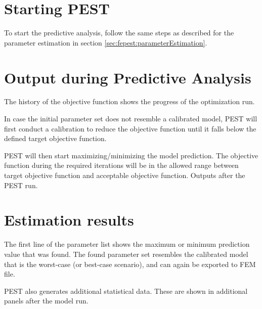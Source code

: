 \section{Starting PEST}

To start the predictive analysis, follow the same steps as described for the parameter estimation in section \ref{sec:fepest:parameterEstimation}.

\section{Output during Predictive Analysis}

The history of the objective function shows the progress of the optimization run. 

In case the initial parameter set does not resemble a calibrated model, PEST will first conduct a calibration to reduce the objective function until it falls below the defined target objective function.

PEST will then start maximizing/minimizing the model prediction. The objective function during the required iterations will be in the allowed range between target objective function and acceptable objective function.
Outputs after the PEST run.

\section{Estimation results}

The first line of the parameter list shows the maximum or minimum prediction value that was found. The found parameter set resembles the calibrated model that is the worst-case (or best-case scenario), and can again be exported to FEM file.

PEST also generates additional statistical data. These are shown in additional panels after the model run.
